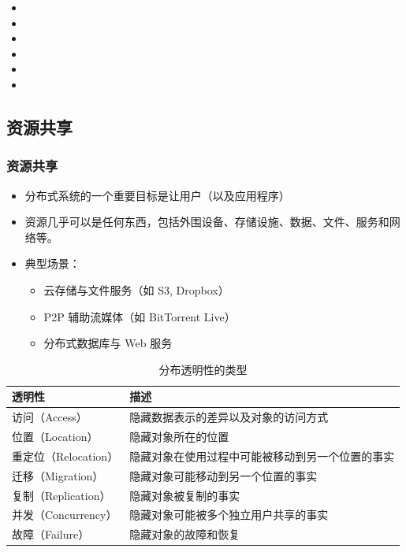 \begin{itemize}
  \item {}
  \item {}
  \item {}
  \item {}
  \item {}
  \item {}
\end{itemize}

\subsection{资源共享}

\subsubsection*{资源共享}

\begin{itemize}
  \item 分布式系统的一个重要目标是让用户（以及应用程序）
  \item 资源几乎可以是任何东西，包括外围设备、存储设施、数据、文件、服务和网络等。
  \item 典型场景：
  \begin{itemize}
    \item 云存储与文件服务（如 S3, Dropbox）
    \item P2P 辅助流媒体（如 BitTorrent Live）
    \item 分布式数据库与 Web 服务
  \end{itemize}
\end{itemize}

\begin{table}[H]
\centering
\caption{分布透明性的类型}
\begin{tabularx}{\textwidth}{>{\raggedright\arraybackslash}p{}X}
\toprule
\textbf{透明性} & \textbf{描述} \\
\midrule
访问（Access） & 隐藏数据表示的差异以及对象的访问方式 \\
位置（Location） & 隐藏对象所在的位置 \\
重定位（Relocation） & 隐藏对象在使用过程中可能被移动到另一个位置的事实 \\
迁移（Migration） & 隐藏对象可能移动到另一个位置的事实 \\
复制（Replication） & 隐藏对象被复制的事实 \\
并发（Concurrency） & 隐藏对象可能被多个独立用户共享的事实 \\
故障（Failure） & 隐藏对象的故障和恢复 \\
\bottomrule
\end{tabularx}
\end{table}

